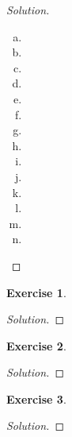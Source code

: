 \documentclass[12pt,a4]{article}
\theoremstyle{definition}
\newtheorem{exercise}{Exercise}
\begin{document}
\begin{proof}[Solution]
\begin{enumerate}[(a)]
		\item 
		
		\item 
		
		\item 
		
		\item 
		
		\item 
		
		\item 
		
		\item 
		
		\item 
		
		\item 
		
		\item 
		
		\item 
		
		\item 
		
		\item 
		
		\item 
	\end{enumerate}
\end{proof}

\begin{exercise}
	
\end{exercise}
\begin{proof}[Solution]
	
\end{proof}

\begin{exercise}
	
\end{exercise}
\begin{proof}[Solution]
	
\end{proof}

\begin{exercise}
	
\end{exercise}
\begin{proof}[Solution]
	
\end{proof}
\end{document}
